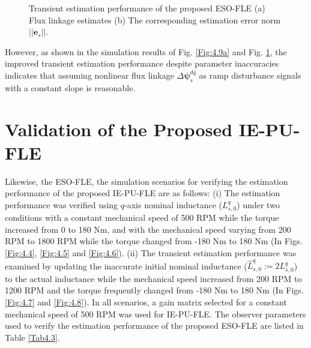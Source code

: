 \begin{figure}[h!]
\begin{subfigure}[c]{1.0\columnwidth}
        \caption{}
        \label{Fig:4.9b}
    \end{subfigure}
    \caption{Transient estimation performance of the proposed ESO-FLE (a) Flux linkage estimates (b) The corresponding estimation error norm $||\mathbf{e}_s||$.}
    \label{Fig:4.9}
\end{figure}However, as shown in the simulation results of Fig. \ref{Fig:4.9a} and Fig. \ref{Fig:4.9b}, the improved transient estimation performance despite parameter inaccuracies indicates that assuming nonlinear flux linkage $\Delta\mathbf{\psi}^{dq}_s$ as ramp disturbance signals with a constant slope is reasonable.

\section{Validation of the Proposed IE-PU-FLE}
Likewise, the ESO-FLE, the simulation scenarios for verifying the estimation performance of the proposed IE-PU-FLE are as follows: (i) The estimation performance was verified using $q$-axis nominal inductance ($L^q_{s,0}$) under two conditions with a constant mechanical speed of 500 RPM while the torque increased from 0 to 180 Nm, and with the mechanical speed varying from 200 RPM to 1800 RPM while the torque changed from -180 Nm to 180 Nm (In Figs. \ref{Fig:4.4}, \ref{Fig:4.5} and \ref{Fig:4.6}). (ii) The transient estimation performance was examined by updating the inaccurate initial nominal inductance ($\hat L^q_{s,0}:=2L^{q}_{s,0}$) to the actual inductance while the mechanical speed increased from 200 RPM to 1200 RPM and the torque frequently changed from -180 Nm to 180 Nm (In Figs. \ref{Fig:4.7} and \ref{Fig:4.8}). In all scenarios, a gain matrix selected for a constant mechanical speed of 500 RPM was used for IE-PU-FLE. The observer parameters used to verify the estimation performance of the proposed ESO-FLE are listed in Table \ref{Tab4.3}.

